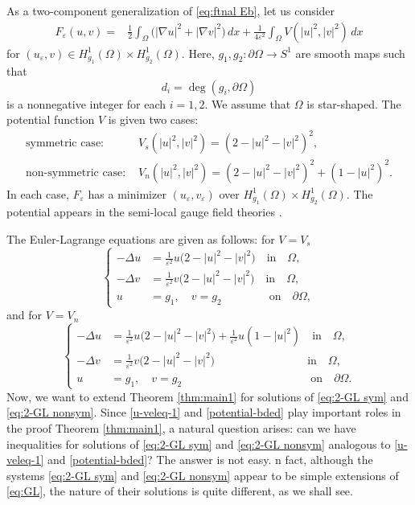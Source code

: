 \documentclass[a4paper,10pt,reqno]{amsart}
\theoremstyle{definition}
\newcommand{\ve}{{\varepsilon}}
\newcommand{\Om}{{\Omega}}
\newcommand{\pa}{\partial}
\newcommand{\qin}{{\quad \mbox{in} \quad}}
\newcommand{\qon}{{\quad \mbox{on} \quad}}
\numberwithin{equation}{section}
\begin{document}
As a two-component generalization of \eqref{eq:ftnal Eb}, let us consider
 \begin{equation}
\label{eq:ftnal G2V}
\begin{aligned}
F_\ve (u, v )  = &\frac12 \int_\Om  \big(|\nabla u|^2+|\nabla v|^2\big) \,dx + \frac{1}{4\ve^2}\int_\Om  V(|u|^2,|v|^2) \,dx
 \end{aligned}
\end{equation}
for $(u_\ve,v) \in H^1_{g_1} (\Om) \times H^1_{g_2}(\Om)$.
Here,  $ g_1, g_2  : \pa \Om \to S^1$ are smooth maps such that
\begin{equation}\label{eq:deg of g sys}
d_i=\deg (g_i,\pa\Om)
\end{equation}
 is a nonnegative integer for each $i=1,2$.
 We assume that $\Om$ is star-shaped.
The potential function $V$ is given two cases:
\begin{align*}
\mbox{symmetric case: }& V_s(|u|^2,|v|^2)=(2-|u|^2-|v|^2)^2,\\
\mbox{non-symmetric case: }& V_n(|u|^2,|v|^2)=(2-|u|^2-|v|^2)^2 + (1-|u|^2)^2.
\end{align*}
In each case, $F_\ve$ has a minimizer $(u_\ve,v_\ve)$ over $H^1_{g_1} (\Om) \times H^1_{g_2}(\Om)$.
The potential appears in the semi-local gauge field theories \cite{Hi92,VaAch91}.

The Euler-Lagrange equations are given as follows: for $V=V_s$
\begin{equation}
\label{eq:2-GL sym}
\left\{
\begin{aligned}
-\Delta u & = \frac{1}{\ve^2} u  \big(2-|u |^2-|v |^2\big)     \qin \Omega,\\
-\Delta v & = \frac{1}{\ve^2}v  \big(2-|u  |^2-|v |^2\big) \qin \Omega,\\
u &=g_1, \quad v =g_2 \qquad \quad ~ \qon \pa\Omega,
\end{aligned}
\right.
\end{equation}
and for $V=V_n$
\begin{equation}
\label{eq:2-GL nonsym}
\left\{
\begin{aligned}
-\Delta u & = \frac{1}{\ve^2} u  \big(2-|u |^2-|v |^2\big)  +  \frac{1}{\ve^2} u   (1- |u |^2 )   \qin \Omega,\\
-\Delta v & = \frac{1}{\ve^2}v  \big(2-|u |^2-|v |^2\big)  \qquad\qquad\qquad\quad ~  \qin \Omega,\\
u &=g_1, \quad v =g_2  \qquad\qquad\qquad \qquad \quad\quad ~~  \qon \pa\Omega.
\end{aligned}
\right.
\end{equation}
Now, we want to extend Theorem \ref{thm:main1} for solutions of \eqref{eq:2-GL sym} and \eqref{eq:2-GL nonsym}.
Since \eqref{u-veleq-1} and \eqref{potential-bded} play important roles  in the proof Theorem \ref{thm:main1}, a  natural question arises: can we have inequalities for solutions of  \eqref{eq:2-GL sym} and \eqref{eq:2-GL nonsym} analogous to \eqref{u-veleq-1} and \eqref{potential-bded}?
The answer is not easy.
n fact, although the systems \eqref{eq:2-GL sym} and \eqref{eq:2-GL nonsym} appear to be simple extensions of \eqref{eq:GL}, the nature of their solutions is quite different, as we shall see.
\end{document}
